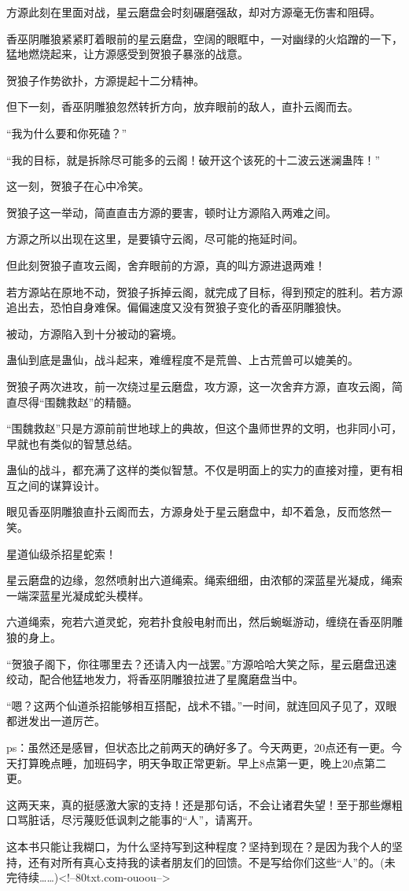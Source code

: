 \begin{this_body}
方源此刻在里面对战，星云磨盘会时刻碾磨强敌，却对方源毫无伤害和阻碍。

香巫阴雕狼紧紧盯着眼前的星云磨盘，空阔的眼眶中，一对幽绿的火焰蹭的一下，猛地燃烧起来，让方源感受到贺狼子暴涨的战意。

贺狼子作势欲扑，方源提起十二分精神。

但下一刻，香巫阴雕狼忽然转折方向，放弃眼前的敌人，直扑云阁而去。

“我为什么要和你死磕？”

“我的目标，就是拆除尽可能多的云阁！破开这个该死的十二波云迷澜蛊阵！”

这一刻，贺狼子在心中冷笑。

贺狼子这一举动，简直直击方源的要害，顿时让方源陷入两难之间。

方源之所以出现在这里，是要镇守云阁，尽可能的拖延时间。

但此刻贺狼子直攻云阁，舍弃眼前的方源，真的叫方源进退两难！

若方源站在原地不动，贺狼子拆掉云阁，就完成了目标，得到预定的胜利。若方源追出去，恐怕自身难保。偏偏速度又没有贺狼子变化的香巫阴雕狼快。

被动，方源陷入到十分被动的窘境。

蛊仙到底是蛊仙，战斗起来，难缠程度不是荒兽、上古荒兽可以媲美的。

贺狼子两次进攻，前一次绕过星云磨盘，攻方源，这一次舍弃方源，直攻云阁，简直尽得“围魏救赵”的精髓。

“围魏救赵”只是方源前前世地球上的典故，但这个蛊师世界的文明，也非同小可，早就也有类似的智慧总结。

蛊仙的战斗，都充满了这样的类似智慧。不仅是明面上的实力的直接对撞，更有相互之间的谋算设计。

眼见香巫阴雕狼直扑云阁而去，方源身处于星云磨盘中，却不着急，反而悠然一笑。

星道仙级杀招星蛇索！

星云磨盘的边缘，忽然喷射出六道绳索。绳索细细，由浓郁的深蓝星光凝成，绳索一端深蓝星光凝成蛇头模样。

六道绳索，宛若六道灵蛇，宛若扑食般电射而出，然后蜿蜒游动，缠绕在香巫阴雕狼的身上。

“贺狼子阁下，你往哪里去？还请入内一战罢。”方源哈哈大笑之际，星云磨盘迅速绞动，配合他猛地发力，将香巫阴雕狼拉进了星魔磨盘当中。

“嗯？这两个仙道杀招能够相互搭配，战术不错。”一时间，就连回风子见了，双眼都迸发出一道厉芒。

ps：虽然还是感冒，但状态比之前两天的确好多了。今天两更，20点还有一更。今天打算晚点睡，加班码字，明天争取正常更新。早上8点第一更，晚上20点第二更。

这两天来，真的挺感激大家的支持！还是那句话，不会让诸君失望！至于那些爆粗口骂脏话，尽污蔑贬低讽刺之能事的“人”，请离开。

这本书只能让我糊口，为什么坚持写到这种程度？坚持到现在？是因为我个人的坚持，还有对所有真心支持我的读者朋友们的回馈。不是写给你们这些“人”的。(未完待续……)<!--80txt.com-ouoou-->

\end{this_body}


